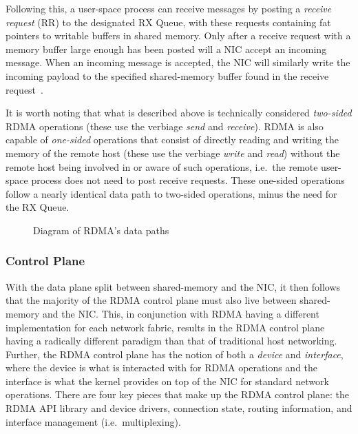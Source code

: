 \documentclass[12pt,titlepage]{article}
\begin{document}
Following this, a user-space process can receive messages by posting a \textit{receive request} (RR) to the designated RX Queue, with these requests containing fat pointers to writable buffers in shared memory.
Only after a receive request with a memory buffer large enough has been posted will a NIC accept an incoming message.
When an incoming message is accepted, the NIC will similarly write the incoming payload to the specified shared-memory buffer found in the receive request~\cite{rdmaawareprogramming}.

It is worth noting that what is described above is technically considered \textit{two-sided} RDMA operations (these use the verbiage \textit{send} and \textit{receive}).
RDMA is also capable of \textit{one-sided} operations that consist of directly reading and writing the memory of the remote host (these use the verbiage \textit{write} and \textit{read}) without the remote host being involved in or aware of such operations, i.e.\ the remote user-space process does not need to post receive requests.
These one-sided operations follow a nearly identical data path to two-sided operations, minus the need for the RX Queue.

\begin{figure}
   \resizebox{\linewidth}{!}{
      \begin{tikzpicture}[x=0.75pt,y=0.75pt,yscale=-1,xscale=1]
         
      \end{tikzpicture}
   }
   \caption{Diagram of RDMA's data paths}
\end{figure}

\subsubsection{Control Plane}
With the data plane split between shared-memory and the NIC, it then follows that the majority of the RDMA control plane must also live between shared-memory and the NIC\@.
This, in conjunction with RDMA having a different implementation for each network fabric, results in the RDMA control plane having a radically different paradigm than that of traditional host networking.
Further, the RDMA control plane has the notion of both a \textit{device} and \textit{interface}, where the device is what is interacted with for RDMA operations and the interface is what the kernel provides on top of the NIC for standard network operations.
There are four key pieces that make up the RDMA control plane: the RDMA API library and device drivers, connection state, routing information, and interface management (i.e.\ multiplexing).
\end{document}
